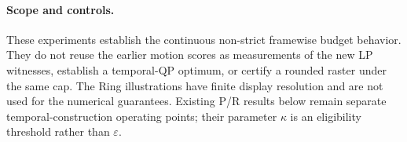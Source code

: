 \paragraph{Scope and controls.}
These experiments establish the continuous non-strict framewise budget behavior. They do not reuse the earlier motion scores as measurements of the new LP witnesses, establish a temporal-QP optimum, or certify a rounded raster under the same cap. The Ring illustrations have finite display resolution and are not used for the numerical guarantees. Existing P/R results below remain separate temporal-construction operating points; their parameter $\kappa$ is an eligibility threshold rather than $\varepsilon$.
